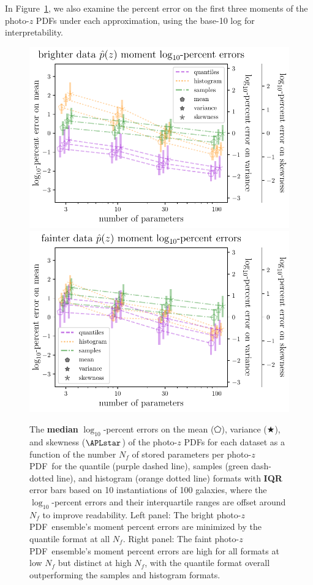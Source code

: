 \documentclass[\docopts]{\docclass}
\newcommand{\pz}{photo-$z$ PDF}
\newcommand{\mgdata}{bright\xspace}
\newcommand{\ssdata}{faint\xspace}
\begin{document}
In Figure~\ref{fig:pz_moment_errs}, we also examine the percent error on the 
first three moments of the \pz s under each approximation, using the base-10 
log for interpretability.
\begin{figure}
  \begin{center}
    \includegraphics[width=\columnwidth]{graham_pz_err.pdf}
    \includegraphics[width=\columnwidth]{schmidt_pz_err.pdf}
    \caption{
    The \textbf{median} $\log_{10}$-percent errors on the mean ($\pentagon$), 
variance ($\bigstar$), and skewness ($\APLstar$) of the \pz s for each dataset 
as a function of the number $N_{f}$ of stored parameters per \pz\ for the 
quantile (purple dashed line), samples (green dash-dotted line), and histogram 
(orange dotted line) formats with \textbf{IQR} error bars based on 10 
instantiations of 100 galaxies, where the $\log_{10}$-percent errors and their 
interquartile ranges are offset around $N_{f}$ to improve readability.
    Left panel: The \mgdata \pz\ ensemble's moment percent errors are minimized 
by the quantile format at all $N_{f}$.
    Right panel: The \ssdata \pz\ ensemble's moment percent errors are high for 
all formats at low $N_{f}$ but distinct at high $N_{f}$, with the quantile 
format overall outperforming the samples and histogram formats.
    \label{fig:pz_moment_errs}}
  \end{center}
\end{figure}
\end{document}

